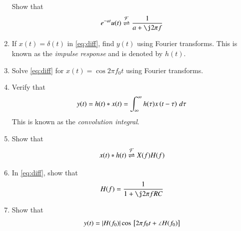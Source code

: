 \documentclass[journal,12pt,twocolumn]{IEEEtran}
\begin{document}
\begin{enumerate}[1.]
Show that
\begin{equation}
e^{-at}u(t) \fourier \frac{1}{a+\j 2\pi f}
\end{equation}
\item If $x(t) = \delta(t)$ in \eqref{eq:diff}, find $y(t)$ using Fourier transforms. This is known as the {\em impulse response} and is denoted by $h(t)$.
\item Solve \eqref{eq:diff} for $x(t) = \cos 2\pi f_0 t$ using Fourier transforms.
\item Verify that
\begin{equation}
y(t) = h(t)*x(t) = \int_{\infty}^{\infty}h(\tau)x\left(t-\tau\right)\, d\tau
\end{equation}
This is known as the {\em convolution integral}.
\item Show that
\begin{equation}
x(t)*h(t) \overset{\mathcal{F}}{ \rightleftharpoons} X(f)H(f)
\end{equation}
\item In  \eqref{eq:diff}, show that
\begin{equation}
H(f) = \frac{1}{1+\j 2\pi f RC}
\end{equation}
\item Show that 
\begin{equation}
y(t) = \left\vert H(f_0)\right\vert\cos{}\left[2\pi f_0 t + \angle H(f_0)\right]
\end{equation}
\end{enumerate}
\end{document}
